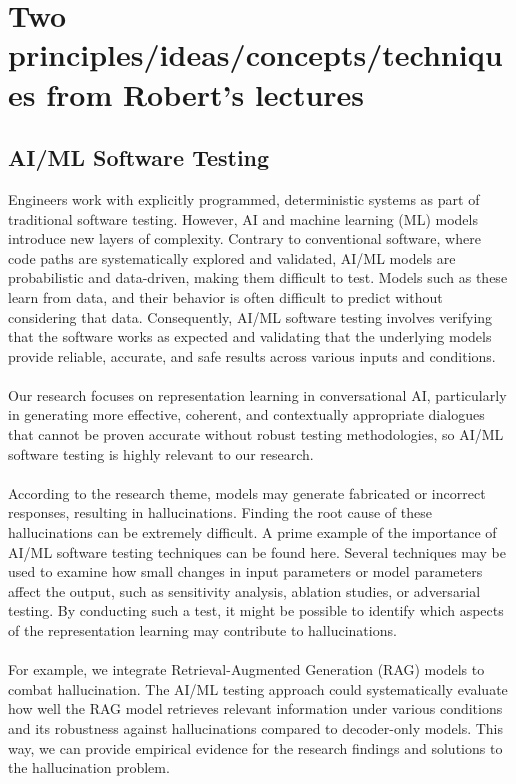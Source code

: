 \documentclass[11pt]{article}
\begin{document}
\section{Two principles/ideas/concepts/techniques from Robert's lectures}

\subsection{AI/ML Software Testing}

Engineers work with explicitly programmed, deterministic systems as part of traditional software testing. However, AI and machine learning (ML) models introduce new layers of complexity. Contrary to conventional software, where code paths are systematically explored and validated, AI/ML models are probabilistic and data-driven, making them difficult to test. Models such as these learn from data, and their behavior is often difficult to predict without considering that data. Consequently, AI/ML software testing involves verifying that the software works as expected and validating that the underlying models provide reliable, accurate, and safe results across various inputs and conditions. \\\\
Our research focuses on representation learning in conversational AI, particularly in generating more effective, coherent, and contextually appropriate dialogues that cannot be proven accurate without robust testing methodologies, so AI/ML software testing is highly relevant to our research. \\\\
According to the research theme, models may generate fabricated or incorrect responses, resulting in hallucinations. Finding the root cause of these hallucinations can be extremely difficult. A prime example of the importance of AI/ML software testing techniques can be found here. Several techniques may be used to examine how small changes in input parameters or model parameters affect the output, such as sensitivity analysis, ablation studies, or adversarial testing. By conducting such a test, it might be possible to identify which aspects of the representation learning may contribute to hallucinations. \\\\
For example, we integrate Retrieval-Augmented Generation (RAG) models to combat hallucination. The AI/ML testing approach could systematically evaluate how well the RAG model retrieves relevant information under various conditions and its robustness against hallucinations compared to decoder-only models. This way, we can provide empirical evidence for the research findings and solutions to the hallucination problem.
\end{document}

